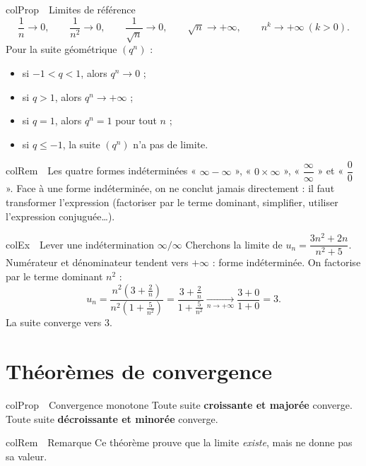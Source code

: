 \documentclass[11pt,a4paper]{article}
\newenvironment{propriete}[1][Propriété]
  {\begin{fiche}{colProp}{\ding{72}~~#1}}{\end{fiche}}
\newenvironment{exemple}[1][Exemple]
  {\begin{fiche}{colEx}{\ding{217}~~#1}}{\end{fiche}}
\newenvironment{remarque}[1][Remarque]
  {\begin{fiche}{colRem}{\ding{43}~~#1}}{\end{fiche}}
\begin{document}
\begin{propriete}[Limites de référence]
\[
  \frac{1}{n} \to 0, \qquad
  \frac{1}{n^2} \to 0, \qquad
  \frac{1}{\sqrt{n}} \to 0, \qquad
  \sqrt{n} \to +\infty, \qquad
  n^k \to +\infty \ (k > 0).
\]
Pour la suite géométrique $(q^n)$ :
\begin{itemize}[leftmargin=8mm, itemsep=0.5mm]
  \item si $-1 < q < 1$, alors $q^n \to 0$ ;
  \item si $q > 1$, alors $q^n \to +\infty$ ;
  \item si $q = 1$, alors $q^n = 1$ pour tout $n$ ;
  \item si $q \leq -1$, la suite $(q^n)$ n'a pas de limite.
\end{itemize}
\end{propriete}

\begin{remarque}[Les quatre formes indéterminées]
« $\infty - \infty$ », « $0 \times \infty$ », « $\dfrac{\infty}{\infty}$ » et « $\dfrac{0}{0}$ ». Face à une forme indéterminée, on ne conclut jamais directement : il faut transformer l'expression (factoriser par le terme dominant, simplifier, utiliser l'expression conjuguée\ldots).
\end{remarque}

\begin{exemple}[Lever une indétermination $\infty/\infty$]
Cherchons la limite de $u_n = \dfrac{3n^2 + 2n}{n^2 + 5}$. Numérateur et dénominateur tendent vers $+\infty$ : forme indéterminée. On factorise par le terme dominant $n^2$ :
\[
  u_n = \frac{n^2\left(3 + \frac{2}{n}\right)}{n^2\left(1 + \frac{5}{n^2}\right)}
      = \frac{3 + \frac{2}{n}}{1 + \frac{5}{n^2}}
  \xrightarrow[n \to +\infty]{} \frac{3 + 0}{1 + 0} = 3.
\]
La suite converge vers $3$.
\end{exemple}

\section{Théorèmes de convergence}

\begin{propriete}[Convergence monotone]
Toute suite \textbf{croissante et majorée} converge. Toute suite \textbf{décroissante et minorée} converge.
\end{propriete}

\begin{remarque}
Ce théorème prouve que la limite \emph{existe}, mais ne donne pas sa valeur.
\end{remarque}
\end{document}
